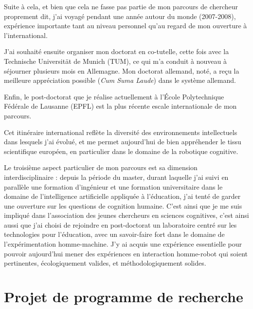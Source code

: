 \documentclass[a4paper]{article}
\begin{document}
Suite à cela, et bien que cela ne fasse pas partie de mon parcours de chercheur
proprement dit, j'ai voyagé pendant une année autour du monde (2007-2008),
expérience importante tant au niveau personnel qu'au regard de mon ouverture à
l'international.

J'ai souhaité ensuite organiser mon doctorat en co-tutelle, cette
fois avec la Technische Universität de Munich (TUM), ce qui m'a conduit à
nouveau à séjourner plusieurs mois en Allemagne. Mon doctorat allemand, noté, a
reçu la meilleure appréciation possible (\emph{Cum Suma Laude}) dans le système
allemand.

Enfin, le post-doctorat que je réalise actuellement à l'École Polytechnique
Fédérale de Lausanne (EPFL) est la plus récente escale internationale de mon
parcours.

Cet itinéraire international reflète la diversité des environnements
intellectuels dans lesquels j'ai évolué, et me permet aujourd'hui de bien
appréhender le tissu scientifique européen, en particulier dans le domaine de la
robotique cognitive.

Le troisième aspect particulier de mon parcours est sa dimension
interdisciplinaire : depuis la période du master, durant laquelle j'ai suivi en
parallèle une formation d'ingénieur et une formation universitaire dans le
domaine de l'intelligence artificielle appliquée à l'éducation, j'ai tenté de
garder une ouverture sur les questions de cognition humaine. C'est ainsi que je
me suis impliqué dans l'association des jeunes chercheurs en sciences
cognitives, c'est ainsi aussi que j'ai choisi de rejoindre en post-doctorat un
laboratoire centré sur les technologies pour l'éducation, avec un savoir-faire
fort dans le domaine de l'expérimentation homme-machine. J'y ai acquis une
expérience essentielle pour pouvoir aujourd'hui mener des expériences en
interaction homme-robot qui soient pertinentes, écologiquement valides, et
méthodologiquement solides.

\printbibliography
\clearpage


\section{Projet de programme de recherche}
\newrefsection
\end{document}
